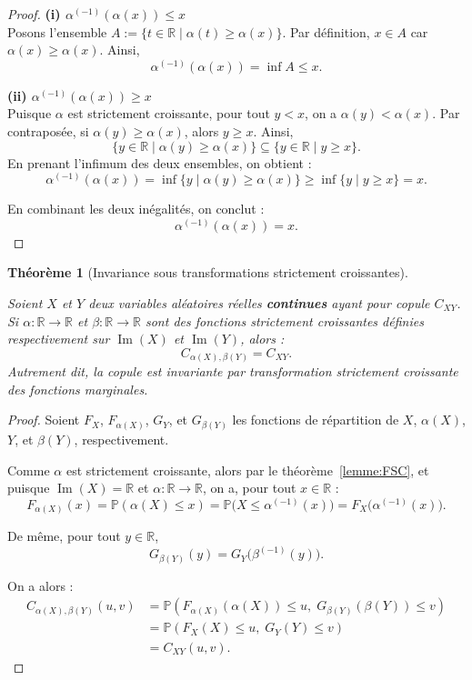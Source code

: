 \documentclass[a4paper,11pt]{amsbook}
\numberwithin{equation}{chapter}
\newtheorem{theoreme}			     {Théorème}	[chapter]
\theoremstyle{definition}
\begin{document}
\begin{proof}
\textbf{(i) \(\alpha^{(-1)}(\alpha(x)) \leq x\)} \\

Posons l'ensemble \( A := \{ t \in \mathbb{R} \mid \alpha(t) \geq \alpha(x) \} \). Par définition, \( x \in A \) car \( \alpha(x) \geq \alpha(x) \). Ainsi,
\[
\alpha^{(-1)}(\alpha(x)) = \inf A \leq x.
\]

\textbf{(ii) \(\alpha^{(-1)}(\alpha(x)) \geq x\)} \\
Puisque \(\alpha\) est strictement croissante, pour tout \(y < x\), on a \(\alpha(y) < \alpha(x)\). Par contraposée, si \(\alpha(y) \geq \alpha(x)\), alors \(y \geq x\). Ainsi,
\[
\{y \in \mathbb{R} \mid \alpha(y) \geq \alpha(x)\} \subseteq \{y \in \mathbb{R} \mid y \geq x\}.
\]
En prenant l'infimum des deux ensembles, on obtient :
\[
\alpha^{(-1)}(\alpha(x)) = \inf\{y \mid \alpha(y) \geq \alpha(x)\} \geq \inf\{y \mid y \geq x\} = x.
\]

En combinant les deux inégalités, on conclut :
\[
\alpha^{(-1)}(\alpha(x)) = x.
\]
\end{proof}


\begin{theoreme}[Invariance sous transformations strictement croissantes]\label{thm:ISTSC}


Soient \( X \) et \( Y \) deux variables aléatoires réelles \textbf{continues} ayant pour copule \( C_{XY} \).  
Si \( \alpha : \mathbb{R} \to \mathbb{R} \) et \( \beta : \mathbb{R} \to \mathbb{R} \) sont des fonctions strictement croissantes définies respectivement sur \( \operatorname{Im}(X) \) et \( \operatorname{Im}(Y) \), alors :
\[
C_{\alpha(X), \beta(Y)} = C_{XY}.
\]
Autrement dit, la copule est invariante par transformation strictement croissante des fonctions marginales.
\end{theoreme}

\begin{proof}
Soient \( F_X \), \( F_{\alpha(X)} \), \( G_Y \), et \( G_{\beta(Y)} \) les fonctions de répartition de \( X \), \( \alpha(X) \), \( Y \), et \( \beta(Y) \), respectivement.

Comme \( \alpha \) est strictement croissante, alors par le théorème~\ref{lemme:FSC}, et puisque \( \operatorname{Im}(X) = \mathbb{R} \) et \( \alpha : \mathbb{R} \to \mathbb{R} \), on a, pour tout \( x \in \mathbb{R} \) :
\[
F_{\alpha(X)}(x) = \mathbb{P}(\alpha(X) \leq x) = \mathbb{P}\big( X \leq \alpha^{(-1)}(x) \big) = F_X\big( \alpha^{(-1)}(x) \big).
\]

De même, pour tout \( y \in \mathbb{R} \),
\[
G_{\beta(Y)}(y) = G_Y\big( \beta^{(-1)}(y) \big).
\]

On a alors :
\[
\begin{aligned}
C_{\alpha(X), \beta(Y)}(u,v) 
&= \mathbb{P}\left( F_{\alpha(X)}(\alpha(X)) \leq u,\; G_{\beta(Y)}(\beta(Y)) \leq v \right) \\
&= \mathbb{P}\left( F_X(X) \leq u,\; G_Y(Y) \leq v \right) \\
&= C_{XY}(u,v).
\end{aligned}
\]
\end{proof}
\end{document}
